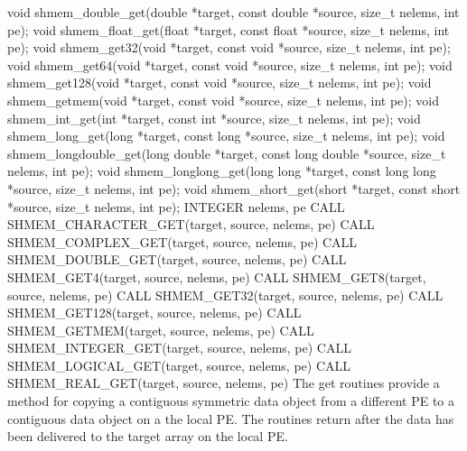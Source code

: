 \synC   %
void shmem_double_get(double *target, const double  *source, size_t nelems, int pe);
void shmem_float_get(float *target, const float *source, size_t nelems, int pe);
void shmem_get32(void *target, const void *source, size_t  nelems,  int pe);
void shmem_get64(void  *target, const void *source, size_t nelems, int pe);
void shmem_get128(void *target, const void *source, size_t nelems,  int pe);
void shmem_getmem(void *target, const void *source, size_t nelems, int pe);
void shmem_int_get(int *target, const int *source, size_t  nelems,  int pe);
void shmem_long_get(long *target, const long *source, size_t nelems, int pe);
void shmem_longdouble_get(long double *target, const long double *source, size_t nelems, 
int pe);
void shmem_longlong_get(long long *target, const long long *source, size_t nelems, int pe);
void shmem_short_get(short *target, const short *source, size_t nelems, int pe);
\synF   %
INTEGER nelems, pe
CALL SHMEM_CHARACTER_GET(target, source, nelems, pe)
CALL SHMEM_COMPLEX_GET(target, source, nelems, pe)
CALL SHMEM_DOUBLE_GET(target, source, nelems, pe)
CALL SHMEM_GET4(target, source, nelems, pe)
CALL SHMEM_GET8(target, source, nelems, pe)
CALL SHMEM_GET32(target, source, nelems, pe)
CALL SHMEM_GET128(target, source, nelems, pe)
CALL SHMEM_GETMEM(target, source, nelems, pe)
CALL SHMEM_INTEGER_GET(target, source, nelems, pe)
CALL SHMEM_LOGICAL_GET(target, source, nelems, pe)
CALL SHMEM_REAL_GET(target, source, nelems, pe)
{
   The  get	 routines  provide  a  method for copying a
   contiguous symmetric data object from a different \ac{PE} to a contiguous data object
   on  a  the  local  \ac{PE}. The  routines return  after the data has been
   delivered to the target array on the local \ac{PE}. 
}
